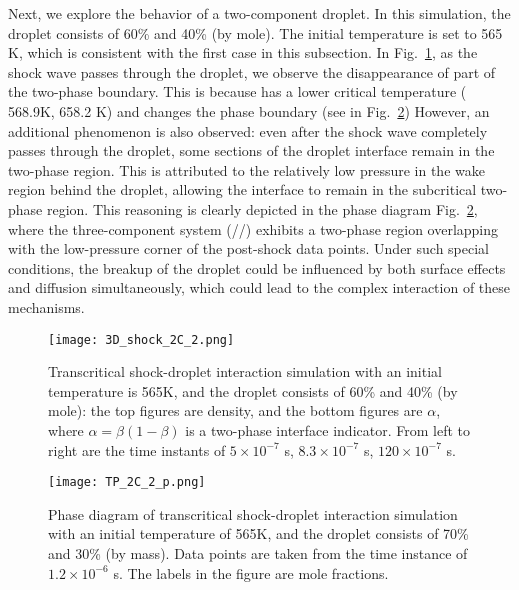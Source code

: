 Next, we explore the behavior of a two-component droplet. In this simulation, the droplet consists of 60\%  and 40\%  (by mole). The initial temperature is set to 565 K, which is consistent with the first case in this subsection. In Fig.~\ref{droplet_3d_2C}, as the shock wave passes through the droplet, we observe the disappearance of part of the two-phase boundary. This is because  has a lower critical temperature ( 568.9K,  658.2 K) and changes the phase boundary (see in Fig.~\ref{droplet_3D_2C_phasediagram}) However, an additional phenomenon is also observed: even after the shock wave completely passes through the droplet, some sections of the droplet interface remain in the two-phase region. This is attributed to the relatively low pressure in the wake region behind the droplet, allowing the interface to remain in the subcritical two-phase region. This reasoning is clearly depicted in the phase diagram Fig.~\ref{droplet_3D_2C_phasediagram}, where the three-component system (//) exhibits a two-phase region overlapping with the low-pressure corner of the post-shock data points. Under such special conditions, the breakup of the droplet could be influenced by both surface effects and diffusion simultaneously, which could lead to the complex interaction of these mechanisms.





\begin{figure}[htbp]
\centering
\texttt{[image: 3D\_shock\_2C\_2.png]}
\caption{Transcritical shock-droplet interaction simulation with an initial temperature is 565K, and the droplet consists of 60\% and 40\% (by mole): the top figures are density, and the bottom figures are $\alpha$, where $\alpha = \beta (1-\beta)$ is a two-phase interface indicator. From left to right are the time instants of $5\times 10^{-7}$ s, $8.3\times 10^{-7}$ s, $120\times 10^{-7}$ s.}
\label{droplet_3d_2C} 
\end{figure}

\begin{figure}[htbp]
\centering
\texttt{[image: TP\_2C\_2\_p.png]}
\caption{Phase diagram of transcritical shock-droplet interaction simulation with an initial temperature of 565K, and the droplet consists of 70\% and 30\% (by mass). Data points are taken from the time instance of $1.2\times 10^{-6}$ s. The labels in the figure are mole fractions.}
\label{droplet_3D_2C_phasediagram} 
\end{figure}


